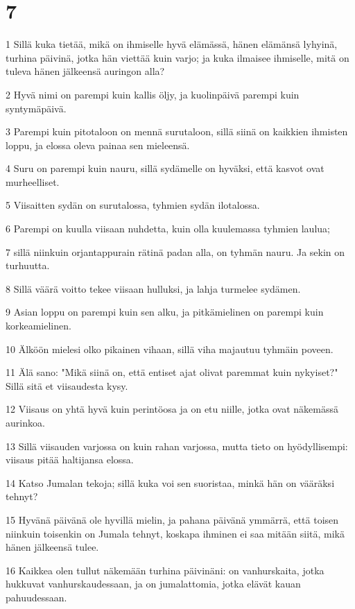 \chapter{7}

\par 1 Sillä kuka tietää, mikä on ihmiselle hyvä elämässä, hänen elämänsä lyhyinä, turhina päivinä, jotka hän viettää kuin varjo; ja kuka ilmaisee ihmiselle, mitä on tuleva hänen jälkeensä auringon alla?
\par 2 Hyvä nimi on parempi kuin kallis öljy, ja kuolinpäivä parempi kuin syntymäpäivä.
\par 3 Parempi kuin pitotaloon on mennä surutaloon, sillä siinä on kaikkien ihmisten loppu, ja elossa oleva painaa sen mieleensä.
\par 4 Suru on parempi kuin nauru, sillä sydämelle on hyväksi, että kasvot ovat murheelliset.
\par 5 Viisaitten sydän on surutalossa, tyhmien sydän ilotalossa.
\par 6 Parempi on kuulla viisaan nuhdetta, kuin olla kuulemassa tyhmien laulua;
\par 7 sillä niinkuin orjantappurain rätinä padan alla, on tyhmän nauru. Ja sekin on turhuutta.
\par 8 Sillä väärä voitto tekee viisaan hulluksi, ja lahja turmelee sydämen.
\par 9 Asian loppu on parempi kuin sen alku, ja pitkämielinen on parempi kuin korkeamielinen.
\par 10 Älköön mielesi olko pikainen vihaan, sillä viha majautuu tyhmäin poveen.
\par 11 Älä sano: "Mikä siinä on, että entiset ajat olivat paremmat kuin nykyiset?" Sillä sitä et viisaudesta kysy.
\par 12 Viisaus on yhtä hyvä kuin perintöosa ja on etu niille, jotka ovat näkemässä aurinkoa.
\par 13 Sillä viisauden varjossa on kuin rahan varjossa, mutta tieto on hyödyllisempi: viisaus pitää haltijansa elossa.
\par 14 Katso Jumalan tekoja; sillä kuka voi sen suoristaa, minkä hän on vääräksi tehnyt?
\par 15 Hyvänä päivänä ole hyvillä mielin, ja pahana päivänä ymmärrä, että toisen niinkuin toisenkin on Jumala tehnyt, koskapa ihminen ei saa mitään siitä, mikä hänen jälkeensä tulee.
\par 16 Kaikkea olen tullut näkemään turhina päivinäni: on vanhurskaita, jotka hukkuvat vanhurskaudessaan, ja on jumalattomia, jotka elävät kauan pahuudessaan.
